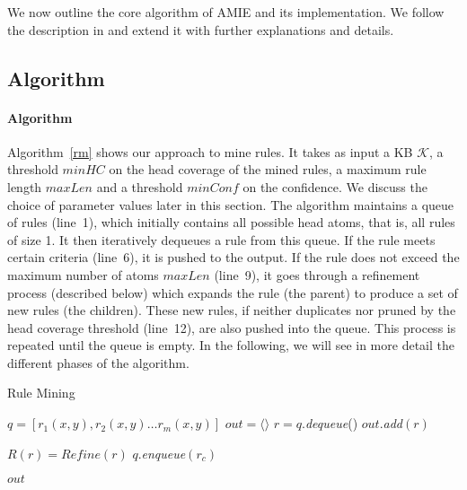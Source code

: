 
We now outline the core algorithm of AMIE and its implementation.
We follow the description in \cite{amie} and extend it with further explanations and details.

\subsection{Algorithm}
\label{subsec:algorithm}

\paragraph{Algorithm} Algorithm~\ref{rm} shows our approach to mine rules. It takes as input a KB $\mathcal{K}$,
a threshold $minHC$ on the head coverage of the mined rules, a maximum rule length $maxLen$
and a threshold $minConf$ on the confidence. We discuss the choice of parameter values later in this section.
The algorithm maintains a queue of rules (line~1), which initially contains all possible head atoms, that is, all rules of size 1.
It then iteratively dequeues a rule from this queue.
If the rule meets certain criteria (line~6), it is pushed to the output.
If the rule does not exceed the maximum number of atoms $maxLen$ (line~9), it goes through a refinement process (described below) which
expands the rule (the parent) to produce a set of new rules (the children). These new rules,
if neither duplicates nor pruned by the head coverage threshold (line~12),
are also pushed into the queue.
This process is repeated until the queue is empty.
In the following, we will see in more detail the different phases of the algorithm.

\begin{algorithm}
\caption{Rule Mining}
\label{rm}
\begin{algorithmic}[1]
    \State $q = [r_1(x,y), r_2(x,y) \dots r_m(x,y)] $
    \State $out = \langle \rangle$
	  \State $r = q.$\emph{dequeue}()
	      \State $out.$\emph{add}$(r)$
	  \EndIf

	    \State $R(r) = Refine(r)$
			\State $q.$\emph{enqueue}$(r_c)$
		    \EndIf
	    \EndFor

	  \EndIf

	\EndWhile
    \State \Return $out$
\EndFunction
\end{algorithmic}
\end{algorithm}

